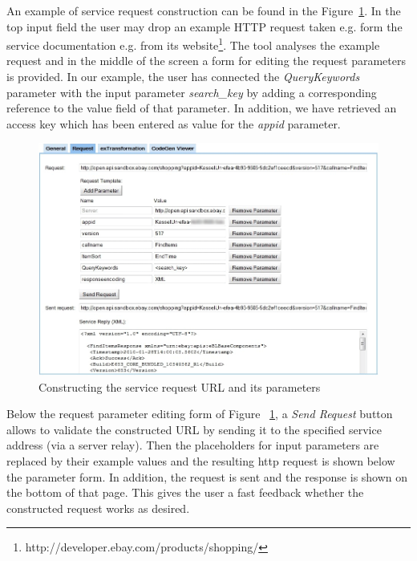 An example of service request construction can be found in the Figure~\ref{fig:construct_service_request}. In the top input field the user may drop an example HTTP request taken e.g. form the service documentation e.g. from its website\footnote{http://developer.ebay.com/products/shopping/}. The tool analyses the example request and in the middle of the screen a form for editing the request parameters is provided. In our example, the user has connected the \textit{QueryKeywords} parameter with the input parameter \textit{search\_key} by adding a corresponding reference to the value field of that parameter. In addition, we have retrieved an access key which has been entered as value for the \textit{appid} parameter.

\begin{figure}
  \begin{center}
    \includegraphics[width=\linewidth]{images/ServiceWrapperToolGVSWithRequestExample.png}
    \caption{Constructing the service request URL and its parameters}
    \label{fig:construct_service_request}
  \end{center}
\end{figure}

Below the request parameter editing form of Figure ~\ref{fig:construct_service_request}, a \textit{Send Request} button allows to validate the constructed URL by sending it to the specified service address (via a server relay). Then the placeholders for input parameters are replaced by their example values and the resulting http request is shown below the parameter form. In addition, the request is sent and the response is shown on the bottom of that page. This gives the user a fast feedback whether the constructed request works as desired. 

